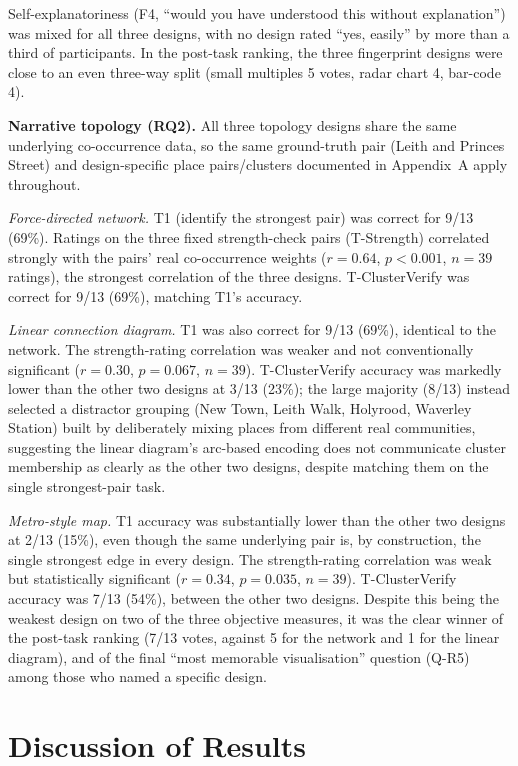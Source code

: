 \documentclass[logo,msc]{infthesis}
\begin{document}
Self-explanatoriness (F4, ``would you have understood this without explanation'') was mixed for all three designs, with no design rated ``yes, easily'' by more than a third of participants. In the post-task ranking, the three fingerprint designs were close to an even three-way split (small multiples 5 votes, radar chart 4, bar-code 4).

\textbf{Narrative topology (RQ2).} All three topology designs share the same underlying co-occurrence data, so the same ground-truth pair (Leith and Princes Street) and design-specific place pairs/clusters documented in Appendix~A apply throughout.

\emph{Force-directed network.} T1 (identify the strongest pair) was correct for 9/13 (69\%). Ratings on the three fixed strength-check pairs (T-Strength) correlated strongly with the pairs' real co-occurrence weights ($r=0.64$, $p<0.001$, $n=39$ ratings), the strongest correlation of the three designs. T-ClusterVerify was correct for 9/13 (69\%), matching T1's accuracy.

\emph{Linear connection diagram.} T1 was also correct for 9/13 (69\%), identical to the network. The strength-rating correlation was weaker and not conventionally significant ($r=0.30$, $p=0.067$, $n=39$). T-ClusterVerify accuracy was markedly lower than the other two designs at 3/13 (23\%); the large majority (8/13) instead selected a distractor grouping (New Town, Leith Walk, Holyrood, Waverley Station) built by deliberately mixing places from different real communities, suggesting the linear diagram's arc-based encoding does not communicate cluster membership as clearly as the other two designs, despite matching them on the single strongest-pair task.

\emph{Metro-style map.} T1 accuracy was substantially lower than the other two designs at 2/13 (15\%), even though the same underlying pair is, by construction, the single strongest edge in every design. The strength-rating correlation was weak but statistically significant ($r=0.34$, $p=0.035$, $n=39$). T-ClusterVerify accuracy was 7/13 (54\%), between the other two designs. Despite this being the weakest design on two of the three objective measures, it was the clear winner of the post-task ranking (7/13 votes, against 5 for the network and 1 for the linear diagram), and of the final ``most memorable visualisation'' question (Q-R5) among those who named a specific design.

\section{Discussion of Results}
\end{document}
